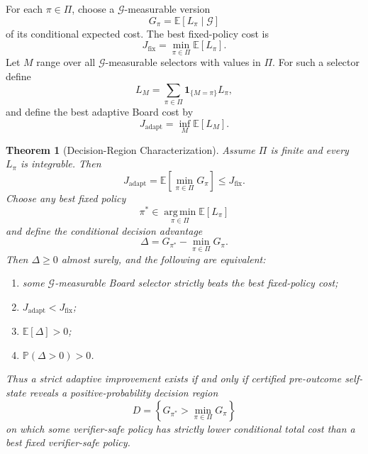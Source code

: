 \documentclass[11pt]{article}
\newtheorem{theorem}{Theorem}
\begin{document}
For each $\pi\in\Pi$, choose a $\mathcal{G}$-measurable version
\[
  G_\pi=\mathbb{E}[L_\pi\mid\mathcal{G}]
\]
of its conditional expected cost. The best fixed-policy cost is
\[
  J_{\mathrm{fix}}
  =\min_{\pi\in\Pi}\mathbb{E}[L_\pi].
\]
Let $M$ range over all $\mathcal{G}$-measurable selectors with values in $\Pi$. For such a selector define
\[
  L_M=\sum_{\pi\in\Pi}\mathbf{1}_{\{M=\pi\}}L_\pi,
\]
and define the best adaptive Board cost by
\[
  J_{\mathrm{adapt}}
  =\inf_M \mathbb{E}[L_M].
\]

\begin{theorem}[Decision-Region Characterization]
Assume $\Pi$ is finite and every $L_\pi$ is integrable. Then
\[
  J_{\mathrm{adapt}}
  =\mathbb{E}\!\left[\min_{\pi\in\Pi}G_\pi\right]
  \le J_{\mathrm{fix}}.
\]
Choose any best fixed policy
\[
  \pi^*\in\operatorname*{arg\,min}_{\pi\in\Pi}\mathbb{E}[L_\pi]
\]
and define the conditional decision advantage
\[
  \Delta
  =G_{\pi^*}-\min_{\pi\in\Pi}G_\pi.
\]
Then $\Delta\ge 0$ almost surely, and the following are equivalent:
\begin{enumerate}
  \item some $\mathcal{G}$-measurable Board selector strictly beats the best fixed-policy cost;
  \item $J_{\mathrm{adapt}}<J_{\mathrm{fix}}$;
  \item $\mathbb{E}[\Delta]>0$;
  \item $\mathbb{P}(\Delta>0)>0$.
\end{enumerate}
Thus a strict adaptive improvement exists if and only if certified pre-outcome self-state reveals a positive-probability decision region
\[
  D=\left\{G_{\pi^*}>\min_{\pi\in\Pi}G_\pi\right\}
\]
on which some verifier-safe policy has strictly lower conditional total cost than a best fixed verifier-safe policy.
\end{theorem}
\end{document}
